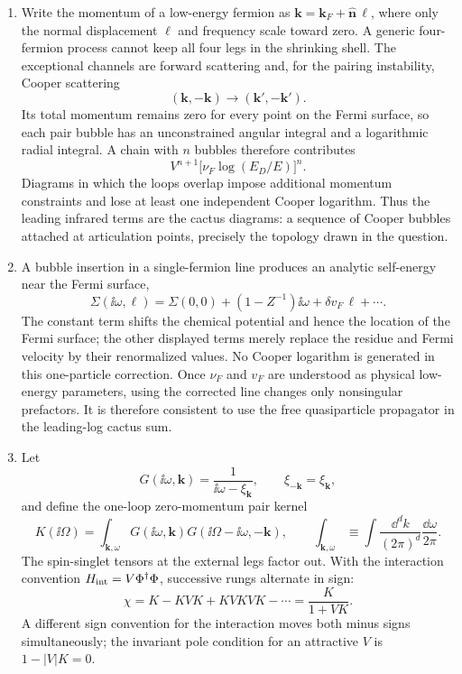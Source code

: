 \begin{enumerate}
  \begin{enumerate}
    \item[(a)]
    Write the momentum of a low-energy fermion as
    \(\mathbf k=\mathbf k_F+\widehat{\mathbf n}\,\ell\), where only the normal displacement
    \(\ell\) and frequency scale toward zero.  A generic four-fermion
    process cannot keep all four legs in the shrinking shell.  The
    exceptional channels are forward scattering and, for the pairing
    instability, Cooper scattering
    \[
      (\mathbf k,-\mathbf k)\longrightarrow(\mathbf k',-\mathbf k').
    \]
    Its total momentum remains zero for every point on the Fermi surface,
    so each pair bubble has an unconstrained angular integral and a
    logarithmic radial integral.  A chain with \(n\) bubbles therefore
    contributes
    \[
      V^{n+1}\bigl[\nu_F\log(E_D/E)\bigr]^n.
    \]
    Diagrams in which the loops overlap impose additional momentum
    constraints and lose at least one independent Cooper logarithm.
    Thus the leading infrared terms are the cactus diagrams: a sequence
    of Cooper bubbles attached at articulation points, precisely the
    topology drawn in the question.

    \item[(b)]
    A bubble insertion in a single-fermion line produces an analytic
    self-energy near the Fermi surface,
    \[
      \Sigma(\ii\omega,\ell)
        =\Sigma(0,0)+(1-Z^{-1})\ii\omega
          +\delta v_F\,\ell+\cdots .
    \]
    The constant term shifts the chemical potential and hence the
    location of the Fermi surface; the other displayed terms merely
    replace the residue and Fermi velocity by their renormalized values.
    No Cooper logarithm is generated in this one-particle correction.
    Once \(\nu_F\) and \(v_F\) are understood as physical low-energy
    parameters, using the corrected line changes only nonsingular
    prefactors.  It is therefore consistent to use the free quasiparticle
    propagator in the leading-log cactus sum.

    \item[(c)]
    Let
    \[
      G(\ii\omega,\mathbf k)=\frac1{\ii\omega-\xi_{\mathbf k}},
      \qquad \xi_{-\mathbf k}=\xi_{\mathbf k},
    \]
    and define the one-loop zero-momentum pair kernel
    \[
      K(\ii\Omega)=
        \int_{\mathbf k,\omega}
        G(\ii\omega,\mathbf k)G(\ii\Omega-\ii\omega,-\mathbf k),
      \qquad
      \int_{\mathbf k,\omega}\equiv
        \int\frac{\dd^dk}{(2\pi)^d}\frac{\dd\omega}{2\pi}.
    \]
    The spin-singlet tensors at the external legs factor out.  With the
    interaction convention
    \(H_{\rm int}=V\Phi^\dagger\Phi\), successive rungs alternate in sign:
    \[
      \chi=K-KVK+KVKVK-\cdots
        =\boxed{\frac{K}{1+VK}}.
    \]
    A different sign convention for the interaction moves both minus
    signs simultaneously; the invariant pole condition for an attractive
    \(V\) is \(1-|V|K=0\).


\end{enumerate}
\end{enumerate}
